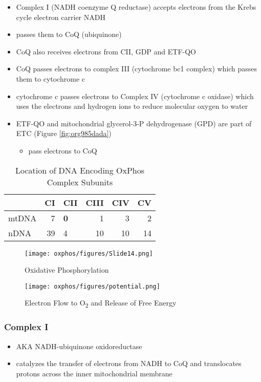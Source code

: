 \documentclass[12pt]{scrartcl}
\begin{document}
\begin{itemize}
\item Complex I (NADH coenzyme Q reductase) accepts electrons from the
Krebs cycle electron carrier NADH
\item passes them to CoQ (ubiquinone)
\item CoQ also receives electrons from CII, GDP and ETF-QO

\item CoQ passes electrons to complex III (cytochrome bc1 complex) which
passes them to cytochrome c
\item cytochrome c passes electrons to Complex IV (cytochrome c oxidase)
which uses the electrons and hydrogen ions to reduce molecular
oxygen to water

\item ETF-QO and mitochondrial glycerol-3-P dehydrogenase (GPD) are part of ETC (Figure \ref{fig:org985dada})
\begin{itemize}
\item pass electrons to CoQ
\end{itemize}
\end{itemize}

\begin{table}[htbp]
\caption{\label{tab:orgc383a2c}Location of DNA Encoding OxPhos Complex Subunits}
\centering
\begin{tabular}{lrlrrr}
 & CI & CII & CIII & CIV & CV\\
\hline
mtDNA & 7 & \textbf{0} & 1 & 3 & 2\\
nDNA & 39 & 4 & 10 & 10 & 14\\
\end{tabular}
\end{table}

\begin{figure}[htbp]
\centering
\texttt{[image: oxphos/figures/Slide14.png]}
\caption[ETC]{\label{fig:orga11cb39}Oxidative Phosphorylation}
\end{figure}

\begin{figure}[htbp]
\centering
\texttt{[image: oxphos/figures/potential.png]}
\caption[redox]{\label{fig:org9fbce64}Electron Flow to O\textsubscript{2} and Release of Free Energy}
\end{figure}

\subsubsection{Complex I}
\label{sec:org668fef8}
\begin{itemize}
\item AKA NADH-ubiquinone oxidoreductase
\item catalyzes the transfer of electrons from NADH to CoQ and
translocates protons across the inner mitochondrial membrane
\end{itemize}
\end{document}
